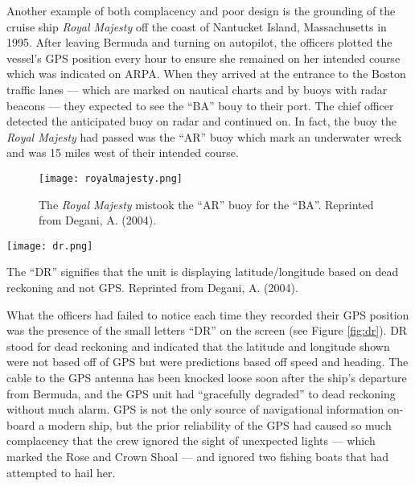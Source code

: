 \documentclass[twoside,symmetric,notoc]{tufte-book}
\begin{document}
\par{%
Another example of both complacency and poor design is the grounding of the cruise ship \textit{Royal Majesty} off the coast of Nantucket Island, Massachusetts in 1995. After leaving Bermuda and turning on autopilot, the officers plotted the vessel's GPS position every hour to ensure she remained on her intended course which was indicated on ARPA. When they arrived at the entrance to the Boston traffic lanes --- which are marked on nautical charts and by buoys with radar beacons --- they expected to see the ``BA'' bouy to their port. The chief officer detected the anticipated buoy on radar and continued on. In fact, the buoy the \textit{Royal Majesty} had passed was the ``AR'' buoy which mark an underwater wreck and was 15 miles west of their intended course.\cite[-0.2in]{Degani}
\begin{figure}
	\centering
		\texttt{[image: royalmajesty.png]}
	\caption[The \textit{Royal Majesty} mistook the ``AR'' buoy for the ``BA''. The \textit{Royal Majesty} mistook the ``AR'' buoy for the ``BA''.]{The \textit{Royal Majesty} mistook the ``AR'' buoy for the ``BA''. Reprinted from Degani, A. (2004).}
	\label{fig:chart}
	\forceversofloat
\end{figure}
\begin{marginfigure}
	\centering
		\texttt{[image: dr.png]}
	\caption[The ``DR'' signifies that the unit is displaying latitude/longitude based on dead reckoning and not GPS.]{The ``DR'' signifies that the unit is displaying latitude/longitude based on dead reckoning and not GPS. Reprinted from Degani, A. (2004).}
	\label{fig:dr}
\end{marginfigure}
\vspace{-0.1in}
What the officers had failed to notice each time they recorded their GPS position was the presence of the small letters ``DR'' on the screen (see Figure \ref{fig:dr}). DR stood for dead reckoning and indicated that the latitude and longitude shown were not based off of GPS but were predictions based off speed and heading. The cable to the GPS antenna has been knocked loose soon after the ship's departure from Bermuda, and the GPS unit had ``gracefully degraded'' to dead reckoning without much alarm. GPS is not the only source of navigational information on-board a modern ship, but the prior reliability of the GPS had caused so much complacency that the crew ignored the sight of unexpected lights --- which marked the Rose and Crown Shoal --- and ignored two fishing boats that had attempted to hail her.\cite{NTSB_1997}
}
\end{document}

